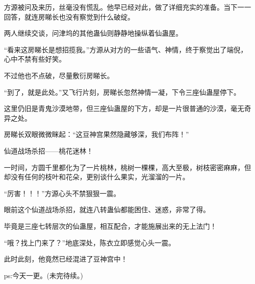 \begin{this_body}
方源被问及来历，丝毫没有慌乱。他早已经对此，做了详细充实的准备。当下一一回答，就连房睇长也没有察觉到什么破绽。

两人继续交谈，问津坞的其他蛊仙则静静地操纵着仙蛊屋。

“看来这房睇长是想招揽我。”方源从对方的一些语气、神情，终于察觉出了端倪，心中不禁有些好笑。

不过他也不点破，尽量敷衍房睇长。

“到了，就是此处。”又飞行片刻，房睇长忽然神情一凝，下令三座仙蛊屋停下。

这里仍旧是青鬼沙漠地带，但三座仙蛊屋的下方，却是一片很普通的沙漠，毫无奇异之处。

房睇长双眼微微眯起：“这豆神宫果然隐藏够深，我们布阵！”

仙道战场杀招——桃花迷林！

一时间，方圆千里都化为了一片桃林，桃树一棵棵，高大至极，树枝密密麻麻，但却没有任何的枝叶和花朵，更别谈什么果实，光溜溜的一片。

“厉害！！！”方源心头不禁狠狠一震。

眼前这个仙道战场杀招，就连八转蛊仙都能困住、迷惑，非常了得。

毕竟是三座七转层次的仙蛊屋，相互配合，才能施展出来的无上法门！

“哦？找上门来了？”地底深处，陈衣立即感觉心头一震。

此时此刻，他竟然已经混进了豆神宫中！

ps:今天一更。(未完待续。)

\end{this_body}

